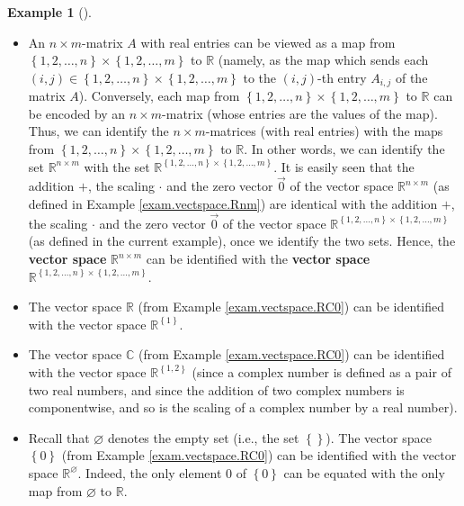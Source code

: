 \documentclass[numbers=enddot,12pt,final,onecolumn,notitlepage]{scrartcl}%
\theoremstyle{definition}
\newtheorem{exam}[theo]{Example}
\newenvironment{example}[1][]
{\begin{exam}[#1]\begin{leftbar}}
{\end{leftbar}\end{exam}}
\begin{document}
\begin{example}
\begin{itemize}
\item An $n\times m$-matrix $A$ with real entries can be viewed as a map from
$\left\{  1,2,\ldots,n\right\}  \times\left\{  1,2,\ldots,m\right\}  $ to
$\mathbb{R}$ (namely, as the map which sends each $\left(  i,j\right)
\in\left\{  1,2,\ldots,n\right\}  \times\left\{  1,2,\ldots,m\right\}  $ to
the $\left(  i,j\right)  $-th entry $A_{i,j}$ of the matrix $A$). Conversely,
each map from $\left\{  1,2,\ldots,n\right\}  \times\left\{  1,2,\ldots
,m\right\}  $ to $\mathbb{R}$ can be encoded by an $n\times m$-matrix (whose
entries are the values of the map). Thus, we can identify the $n\times
m$-matrices (with real entries) with the maps from $\left\{  1,2,\ldots
,n\right\}  \times\left\{  1,2,\ldots,m\right\}  $ to $\mathbb{R}$. In other
words, we can identify the set $\mathbb{R}^{n\times m}$ with the set
$\mathbb{R}^{\left\{  1,2,\ldots,n\right\}  \times\left\{  1,2,\ldots
,m\right\}  }$. It is easily seen that the addition $+$, the scaling $\cdot$
and the zero vector $\overrightarrow{0}$ of the vector space $\mathbb{R}%
^{n\times m}$ (as defined in Example \ref{exam.vectspace.Rnm}) are identical
with the addition $+$, the scaling $\cdot$ and the zero vector
$\overrightarrow{0}$ of the vector space $\mathbb{R}^{\left\{  1,2,\ldots
,n\right\}  \times\left\{  1,2,\ldots,m\right\}  }$ (as defined in the current
example), once we identify the two sets. Hence, the \textbf{vector space}
$\mathbb{R}^{n\times m}$ can be identified with the \textbf{vector space}
$\mathbb{R}^{\left\{  1,2,\ldots,n\right\}  \times\left\{  1,2,\ldots
,m\right\}  }$.

\item The vector space $\mathbb{R}$ (from Example \ref{exam.vectspace.RC0})
can be identified with the vector space $\mathbb{R}^{\left\{  1\right\}  }$.

\item The vector space $\mathbb{C}$ (from Example \ref{exam.vectspace.RC0})
can be identified with the vector space $\mathbb{R}^{\left\{  1,2\right\}  }$
(since a complex number is defined as a pair of two real numbers, and since
the addition of two complex numbers is componentwise, and so is the scaling of
a complex number by a real number).

\item Recall that $\varnothing$ denotes the empty set (i.e., the set $\left\{
{}\right\}  $). The vector space $\left\{  0\right\}  $ (from Example
\ref{exam.vectspace.RC0}) can be identified with the vector space
$\mathbb{R}^{\varnothing}$. Indeed, the only element $0$ of $\left\{
0\right\}  $ can be equated with the only map from $\varnothing$ to
$\mathbb{R}$.


\end{itemize}
\end{example}
\end{document}

